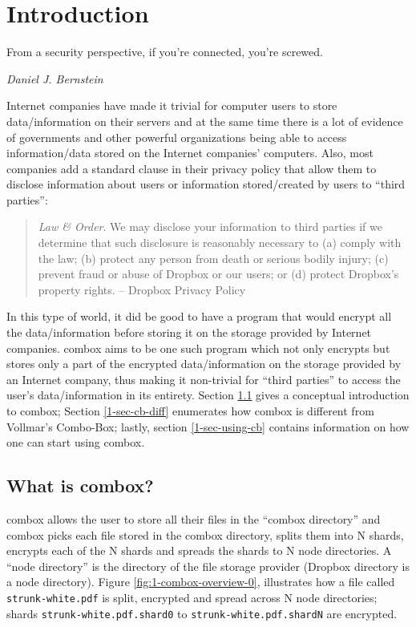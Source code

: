 \chapter{Introduction}

\epigraph{From a security perspective, if you're connected, you're
  screwed.}{\textit{Daniel J. Bernstein}}

Internet companies have made it trivial for computer users to store
data/information on their servers and at the same time there is a lot
of evidence of governments and other powerful organizations being able
to access information/data stored on the Internet companies'
computers\cite{website:wikileaks-spyfiles}. Also, most companies add a
standard clause in their privacy policy that allow them to disclose
information about users or information stored/created by users to
``third parties'':

\begin{quote}
  \emph{Law \& Order}. We may disclose your information to third
  parties if we determine that such disclosure is reasonably necessary
  to (a) comply with the law; (b) protect any person from death or
  serious bodily injury; (c) prevent fraud or abuse of Dropbox or our
  users; or (d) protect Dropbox's property rights. -- Dropbox Privacy
  Policy\cite{website:dropbox-privacy}
\end{quote}

In this type of world, it did be good to have a program that would
encrypt all the data/information before storing it on the storage
provided by Internet companies. combox aims to be one such program
which not only encrypts but stores only a part of the encrypted
data/information on the storage provided by an Internet company, thus
making it non-trivial for ``third parties'' to access the user's
data/information in its entirety. Section \ref{1-sec-cb} gives a conceptual
introduction to combox; Section \ref{1-sec-cb-diff} enumerates how
combox is different from Vollmar's Combo-Box; lastly, section
\ref{1-sec-using-cb} contains information on how one can start using
combox.

\section{What is combox?}\label{1-sec-cb}

combox allows the user to store all their  files in the ``combox
directory'' and combox picks each file stored in the combox directory,
splits them into N shards, encrypts each of the N shards and spreads
the shards to N node directories. A ``node directory'' is the
directory of the file storage provider (Dropbox directory is a node
directory). Figure \ref{fig:1-combox-overview-0}, illustrates how a file
called \verb+strunk-white.pdf+ is split, encrypted and spread across
N node directories; shards \verb+strunk-white.pdf.shard0+ to
\verb+strunk-white.pdf.shardN+ are encrypted.

